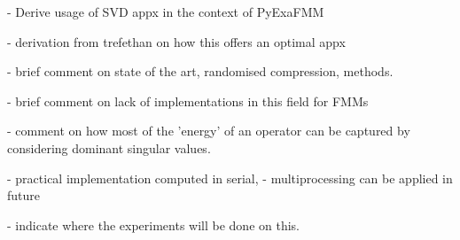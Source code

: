 - Derive usage of SVD appx in the context of PyExaFMM

- derivation from trefethan on how this offers an optimal appx

- brief comment on state of the art, randomised compression, methods.

- brief comment on lack of implementations in this field for FMMs

- comment on how most of the 'energy' of an operator can be captured by
considering dominant singular values.

- practical implementation computed in serial,
    - multiprocessing can be applied in future

- indicate where the experiments will be done on this.